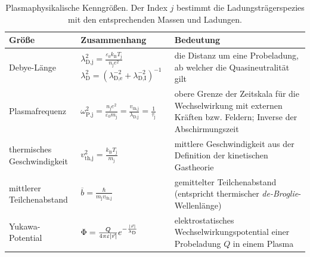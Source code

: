 \documentclass[numbers=noenddot,a4paper]{scrartcl}
\newcommand{\ix}[1]{_\text{#1}}
\newcommand{\tilt}[1]{\textit{#1}}
\newcommand{\euler}{\mathnormal{e}}
\begin{document}
				\begin{table}[H]
					\centering
						\begin{tabular}{m{0.3\textwidth}|m{}|m{}}
							Größe & Zusammenhang & Bedeutung \\ 
							\hline  Debye-Länge & $\lambda\ix{D,j}^2=\frac{\varepsilon\ix{0}k\ix{B}T\ix{j}}{n\ix{j}e^2}$
							\newline
							$\lambda\ix{D}^2=\left(\lambda\ix{D,e}^{-2}+\lambda\ix{D,I}^{-2}\right)^{-1}$ & die Distanz um eine Probeladung, ab welcher die Quasineutralität gilt\\ 

							\hline Plasmafrequenz & $\omega\ix{P,j}^2=\frac{n\ix{j}e^2}{\varepsilon\ix{0}m\ix{j}}=\frac{v\ix{th,j}}{\lambda\ix{D,j}}=\frac{1}{\tau\ix{j}}$ & obere Grenze der Zeitskala für die Wechselwirkung mit externen Kräften bzw. Feldern; Inverse der Abschirmungszeit \\ 

							\hline thermisches Geschwindigkeit & $v\ix{th,j}^2=\frac{k\ix{B}T\ix{j}}{m\ix{j}}$ & mittlere Geschwindigkeit aus der Definition der kinetischen Gastheorie \\ 

							\hline mittlerer Teilchenabstand & $\overline{b}=\frac{\hbar}{m\ix{j}v\ix{th,j}}$ & gemittelter Teilchenabstand (entspricht thermischer \mbox{\tilt{de-Broglie}-Wellenlänge}) \\ 

							\hline Yukawa-Potential & $\Phi=\frac{Q}{4\pi\varepsilon|\vec{r}|}\euler^{-\frac{|\vec{r}|}{\lambda\ix{D}}}$ & elektrostatisches Wechselwirkungspotential einer Probeladung $Q$ in einem Plasma \\

							\hline

						\end{tabular}
					\caption{Plasmaphysikalische Kenngrößen. Der Index $j$ bestimmt die Ladungsträgerspezies mit den entsprechenden Massen und Ladungen.}
					\label{tab:kenngroessen}
				\end{table}
\end{document}
